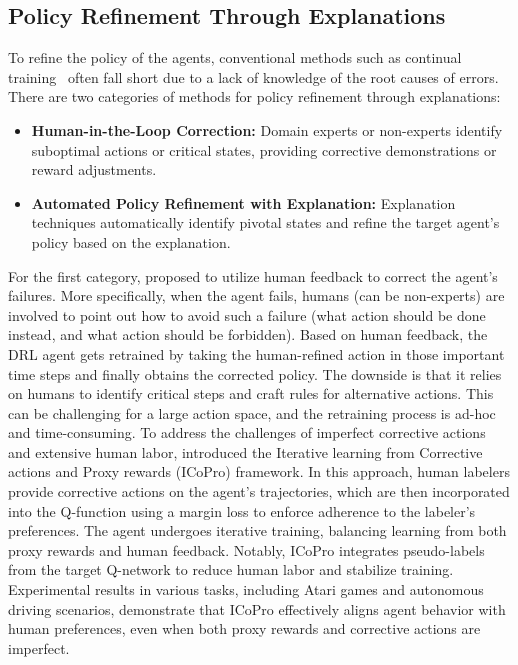 \subsection{Policy Refinement Through Explanations}

To refine the policy of the agents, conventional methods such as continual training~\citep{fickinger2021scalable} often fall short due to a lack of knowledge of the root causes of errors. There are two categories of methods for policy refinement through explanations:
\begin{itemize}
    \item \textbf{Human-in-the-Loop Correction:} Domain experts or non-experts identify suboptimal actions or critical states, providing corrective demonstrations or reward adjustments.
    \item \textbf{Automated Policy Refinement with Explanation:} Explanation techniques automatically identify pivotal states and refine the target agent's policy based on the explanation.
\end{itemize}



For the first category, \cite{van2022correct} proposed to utilize human feedback to correct the agent's failures. 
More specifically, when the agent fails, humans (can be non-experts) are involved to point out how to avoid such a failure (\ie what action should be done instead, and what action should be forbidden). Based on human feedback, the DRL agent gets retrained by taking the human-refined action in those important time steps and finally obtains the corrected policy. 
The downside is that it relies on humans to identify critical steps and craft rules for alternative actions. This can be challenging for a large action space, and the retraining process is ad-hoc and time-consuming. To address the challenges of imperfect corrective actions and extensive human labor, \citet{jiang2024reinforcement} introduced the Iterative learning from Corrective actions and Proxy rewards (ICoPro) framework. In this approach, human labelers provide corrective actions on the agent's trajectories, which are then incorporated into the Q-function using a margin loss to enforce adherence to the labeler's preferences. The agent undergoes iterative training, balancing learning from both proxy rewards and human feedback. Notably, ICoPro integrates pseudo-labels from the target Q-network to reduce human labor and stabilize training. Experimental results in various tasks, including Atari games and autonomous driving scenarios, demonstrate that ICoPro effectively aligns agent behavior with human preferences, even when both proxy rewards and corrective actions are imperfect.

